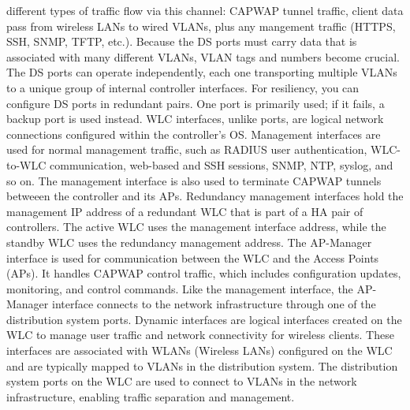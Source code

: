 \documentclass{article}
\begin{document}
\begin{itemize}
different types of traffic flow via this channel: CAPWAP tunnel traffic, client data pass from wireless LANs to wired VLANs, plus any mangement traffic (HTTPS, SSH, SNMP, TFTP, etc.). Because the DS ports must carry data that is associated with many different VLANs, VLAN tags and numbers become crucial. The DS ports can operate independently, each one transporting multiple VLANs to a unique group of internal controller interfaces. For resiliency, you can configure DS ports in redundant pairs. One port is primarily used; if it fails, a backup port is used instead. WLC interfaces, unlike ports, are logical network connections configured within the controller's OS. Management interfaces are used for normal management traffic, such as RADIUS user authentication, WLC-to-WLC communication, web-based and SSH sessions, SNMP, NTP, syslog, and so on. The management interface is also used to terminate CAPWAP tunnels betweeen the controller and its APs. Redundancy management interfaces hold the management IP address of a redundant WLC that is part of a HA pair of controllers. The active WLC uses the management interface address, while the standby WLC uses the redundancy management address. The AP-Manager interface is used for communication between the WLC and the Access Points (APs). It handles CAPWAP control traffic, which includes configuration updates, monitoring, and control commands. Like the management interface, the AP-Manager interface connects to the network infrastructure through one of the distribution system ports. Dynamic interfaces are logical interfaces created on the WLC to manage user traffic and network connectivity for wireless clients. These interfaces are associated with WLANs (Wireless LANs) configured on the WLC and are typically mapped to VLANs in the distribution system. The distribution system ports on the WLC are used to connect to VLANs in the network infrastructure, enabling traffic separation and management.	

\end{itemize}
\end{document}
